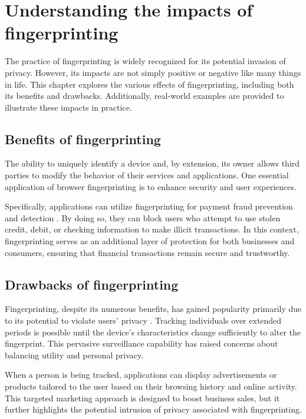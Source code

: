\section{Understanding the impacts of fingerprinting}
\label{FingerprintingThreatsOpportunities}

The practice of fingerprinting is widely recognized for its potential invasion of privacy. However, its impacts are not simply positive or negative like many things in life. This chapter explores the various effects of fingerprinting, including both its benefits and drawbacks. Additionally, real-world examples are provided to illustrate these impacts in practice.

\subsection{Benefits of fingerprinting}

The ability to uniquely identify a device and, by extension, its owner allows third parties to modify the behavior of their services and applications. One essential application of browser fingerprinting is to enhance security and user experiences.

Specifically, applications can utilize fingerprinting for payment fraud prevention and detection \cite{FingerprintJSUseCases}. By doing so, they can block users who attempt to use stolen credit, debit, or checking information to make illicit transactions. In this context, fingerprinting serves as an additional layer of protection for both businesses and consumers, ensuring that financial transactions remain secure and trustworthy.

\subsection{Drawbacks of fingerprinting}

Fingerprinting, despite its numerous benefits, has gained popularity primarily due to its potential to violate users' privacy \cite{WP224Fingerprinting}. Tracking individuals over extended periods is possible until the device's characteristics change sufficiently to alter the fingerprint. This pervasive surveillance capability has raised concerns about balancing utility and personal privacy.

When a person is being tracked, applications can display advertisements or products tailored to the user based on their browsing history and online activity. This targeted marketing approach is designed to boost business sales, but it further highlights the potential intrusion of privacy associated with fingerprinting.

